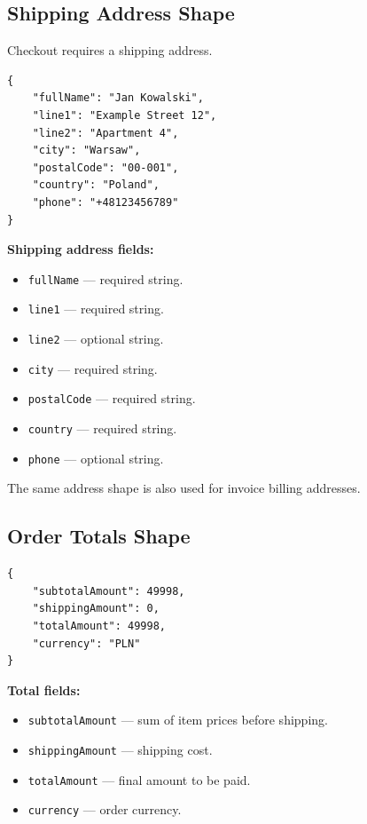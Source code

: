 \subsection{Shipping Address Shape}

Checkout requires a shipping address.

\begin{verbatim}
{
    "fullName": "Jan Kowalski",
    "line1": "Example Street 12",
    "line2": "Apartment 4",
    "city": "Warsaw",
    "postalCode": "00-001",
    "country": "Poland",
    "phone": "+48123456789"
}
\end{verbatim}

\textbf{Shipping address fields:}

\begin{itemize}
    \item \texttt{fullName} --- required string.
    \item \texttt{line1} --- required string.
    \item \texttt{line2} --- optional string.
    \item \texttt{city} --- required string.
    \item \texttt{postalCode} --- required string.
    \item \texttt{country} --- required string.
    \item \texttt{phone} --- optional string.
\end{itemize}

The same address shape is also used for invoice billing addresses.

\subsection{Order Totals Shape}

\begin{verbatim}
{
    "subtotalAmount": 49998,
    "shippingAmount": 0,
    "totalAmount": 49998,
    "currency": "PLN"
}
\end{verbatim}

\textbf{Total fields:}

\begin{itemize}
    \item \texttt{subtotalAmount} --- sum of item prices before shipping.
    \item \texttt{shippingAmount} --- shipping cost.
    \item \texttt{totalAmount} --- final amount to be paid.
    \item \texttt{currency} --- order currency.
\end{itemize}

